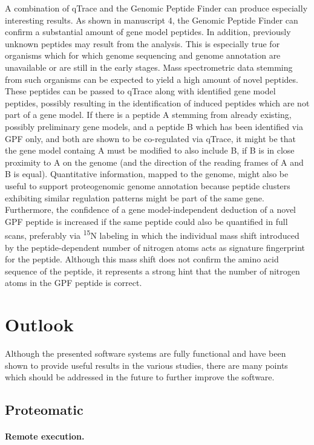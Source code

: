 A combination of qTrace and the Genomic Peptide Finder can produce especially
interesting results.
As shown in manuscript 4, the Genomic Peptide Finder can confirm a substantial
amount of gene model peptides.
In addition, previously unknown peptides may result from the analysis.
This is especially true for organisms which for which genome sequencing and
genome annotation are unavailable or are still in the early stages.
Mass spectrometric data stemming from such organisms can be expected to
yield a high amount of novel peptides.
These peptides can be passed to qTrace along with identified gene model 
peptides, possibly resulting in the identification of induced peptides which
are not part of a gene model.
If there is a peptide A stemming from already existing, possibly preliminary gene
models, and a peptide B which has been identified via GPF only, and both
are shown to be co-regulated via qTrace, it might be that the gene model
containg A must be modified to also include B, if B is in close proximity to A
on the genome (and the direction of the reading frames of A and B is equal).
Quantitative information, mapped to the genome, might also be useful to
support proteogenomic genome annotation because peptide clusters exhibiting 
similar regulation patterns might be part of the same gene.
Furthermore, the confidence of a gene model-independent deduction of a novel 
GPF peptide is increased if the same peptide could also be quantified in full
scans, preferably via \textsuperscript{15}N labeling in which the individual
mass shift introduced by the peptide-dependent number of nitrogen atoms acts
as signature fingerprint for the peptide.
Although this mass shift does not confirm the amino acid sequence of the 
peptide, it represents a strong hint that the number of nitrogen atoms in
the GPF peptide is correct.

\section{Outlook}

Although the presented software systems are fully functional and have been
shown to provide useful results in the various studies, there are many
points which should be addressed in the future to further improve the software.

\subsection{Proteomatic}

\paragraph{Remote execution.}

